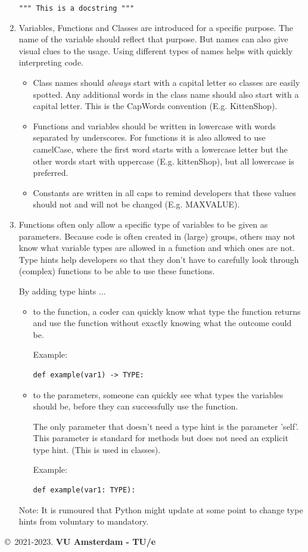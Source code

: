 \documentclass{tufte-handout}
\newcommand{\B}{\bfseries}
\begin{document}
\begin{enumerate}
\indent	\lstinline{""" This is a docstring """}
  

\item Variables, Functions and Classes are introduced for a specific purpose.
\marginpar{\B Naming}
  The name of the variable should reflect that purpose.
  But names can also give visual clues to the usage. 
  Using different types of names helps with quickly interpreting code.
  \begin{itemize}
      \item Class names should \emph{always} start with a capital letter so classes are easily spotted. Any additional words in the class name should also start with a capital letter. This is the CapWords convention (E.g. KittenShop).
      \item Functions and variables should be written in lowercase with words separated by underscores. 
      For functions it is also allowed to use camelCase, where the first word starts with a lowercase letter but the other words start with uppercase (E.g. kittenShop), but all lowercase is preferred.
      \item Constants are written in all caps to remind developers that these values should not and will not be changed (E.g. MAXVALUE).
  \end{itemize}
  
  

\item Functions often only allow a specific type of variables 
\marginpar{\B Type~Hints}
  to be given as parameters.
  Because code is often created in (large) groups, others may not know what variable types are allowed in a function and which ones are not.
  Type hints help developers so that they don't have to carefully look through (complex) functions to be able to use these functions.
  
  By adding type hints ...
  \begin{itemize}
      \item to the function, a coder can quickly know what type the function returns and use the function without exactly knowing what the outcome could be.
      
      Example: \begin{lstlisting}[numbers=none]
      def example(var1) -> TYPE:
      \end{lstlisting}
      \item to the parameters, someone can quickly see what types the variables should be, before they can successfully use the function.
      
      The only parameter that doesn't need a type hint is the parameter 'self'. This parameter is standard for methods but does not need an explicit type hint. (This is used in classes).
      
      Example: \begin{lstlisting}[numbers=none]
      def example(var1: TYPE):
      \end{lstlisting}
  \end{itemize}
  Note: It is rumoured that Python might update at some point to change type hints from voluntary to mandatory.


\end{enumerate}


%



\copyright~2021-2023. \textbf{VU Amsterdam - TU/e}
\end{document}
